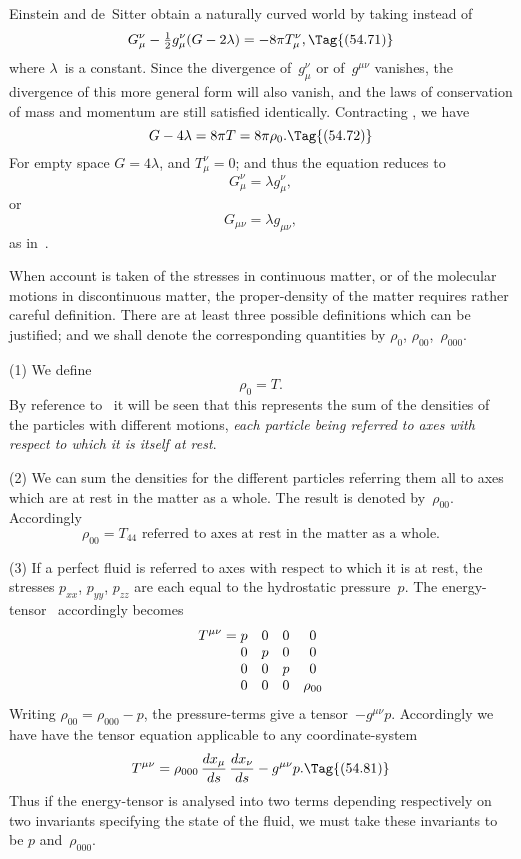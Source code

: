 \documentclass[12pt]{book}
\begin{document}
Einstein and de~Sitter obtain a naturally curved world by taking instead
of~
\[
G_{\mu}^{\nu} - \tfrac{1}{2}g_{\mu}^{\nu}(G - 2\lambda) = -8\pi T_{\mu}^{\nu},
\Tag{(54.71)}
\]
where $\lambda$~is a constant. Since the divergence of~$g_{\mu}^{\nu}$ or of~$g^{\mu\nu}$ vanishes, the
divergence of this more general form will also vanish, and the laws of conservation
of mass and momentum are still satisfied identically. Contracting
, we have
\[
G - 4\lambda = 8\pi T = 8\pi \rho_{0}.
\Tag{(54.72)}
\]
For empty space $G = 4\lambda$, and $T_{\mu}^{\nu} = 0$; and thus the equation reduces to
\[
G_{\mu}^{\nu} = \lambda g_{\mu}^{\nu},
\]
or
\[
G_{\mu\nu} = \lambda g_{\mu\nu},
\]
as in~.

When account is taken of the stresses in continuous matter, or of the
%
molecular motions in discontinuous matter, the proper-density of the matter
%
requires rather careful definition. There are at least three possible definitions
which can be justified; and we shall denote the corresponding quantities by
$\rho_{0}$, $\rho_{00}$,~$\rho_{000}$.

(1) We define
\[
\rho_{0} = T.
\]
By reference to~ it will be seen that this represents the sum of the
densities of the particles with different motions, \emph{each particle being referred
to axes with respect to which it is itself at rest}.

(2) We can sum the densities for the different particles referring them
all to axes which are at rest in the matter as a whole. The result is denoted
by~$\rho_{00}$. Accordingly
\[
\text{$\rho_{00} = T_{44}$ referred to axes at rest in the matter as a whole.}
\]

(3) If a perfect fluid is referred to axes with respect to which it is at rest,
the stresses $p_{xx}$, $p_{yy}$, $p_{zz}$ are each equal to the hydrostatic pressure~$p$. The
%
%
energy-tensor~ accordingly becomes
\[
T^{\mu\nu} = \begin{array}[t]{@{}c@{\quad}c@{\quad}c@{\quad}c@{}}
  p & 0 & 0 & 0\\
  0 & p & 0 & 0\\
  0 & 0 & p & 0\\
  0 & 0 & 0 & \rho_{00}\\
\end{array}
\]
Writing $\rho_{00} = \rho_{000} - p$, the pressure-terms give a tensor~$-g^{\mu\nu} p$. Accordingly
we have have the tensor equation applicable to any coordinate-system
\[
T^{\mu\nu} = \rho_{000}\, \frac{dx_{\mu}}{ds}\, \frac{dx_{\nu}}{ds} - g^{\mu\nu} p.
\Tag{(54.81)}
\]
Thus if the energy-tensor is analysed into two terms depending respectively
on two invariants specifying the state of the fluid, we must take these invariants
to be $p$ and~$\rho_{000}$.
\end{document}
